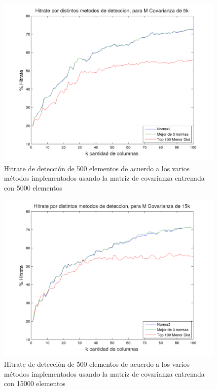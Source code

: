 \begin{figure}[H]
\begin {center}
\includegraphics[width=\hrwidth]{plots/hitrate-5kcv.png}
\end {center}
\caption{Hitrate de detecci\'on de 500 elementos de acuerdo a los varios m\'etodos implementados
usando la matriz de covarianza entrenada con 5000 elementos}
\label{fig:HR5kcv}
\end{figure}

\begin{figure}[H]
\begin {center}
\includegraphics[width=\hrwidth]{plots/hitrate-15kcv.png}
\end {center}
\caption{Hitrate de detecci\'on de 500 elementos de acuerdo a los varios m\'etodos implementados
usando la matriz de covarianza entrenada con 15000 elementos}
\label{fig:HR15kcv}
\end{figure}


